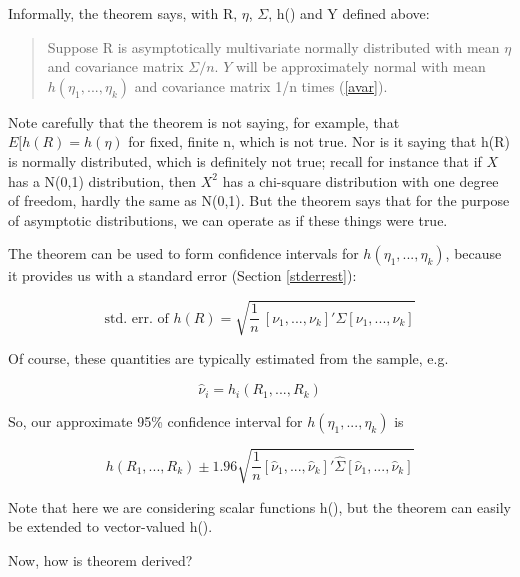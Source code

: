 Informally, the theorem says, with R, $\eta$, $\Sigma$, h() and Y
defined above:

\begin{quote}
Suppose R is asymptotically multivariate normally distributed
with mean $\eta$ and covariance matrix $\Sigma/n$.  $Y$ will be 
approximately normal with mean $h(\eta_1,...,\eta_k)$ and covariance 
matrix 1/n times (\ref{avar}).  
\end{quote} 

Note carefully that the theorem is not saying, for example, that $E[h(R)
= h(\eta)$ for fixed, finite n, which is not true.  Nor is it saying
that h(R) is normally distributed, which is definitely not true; recall
for instance that if $X$ has a N(0,1) distribution, then $X^2$ has a
chi-square distribution with one degree of freedom, hardly the same as
N(0,1).  But the theorem says that for the purpose of asymptotic
distributions, we can operate as if these things were true.

The theorem can be used to form confidence intervals for
$h(\eta_1,...,\eta_k)$, because it provides us with a standard error
(Section \ref{stderrest}): 

\begin{equation}
\textrm{std. err. of } h(R) = \sqrt{\frac{1}{n} ~ 
[\nu_1,...,\nu_k]' \Sigma [\nu_1,...,\nu_k]}
\end{equation}

Of course, these quantities are typically estimated from the sample,
e.g.

\begin{equation}
\widehat{\nu}_i = h_i(R_1,...,R_k)
\end{equation}

So, our approximate 95\% confidence interval for $h(\eta_1,...,\eta_k)$
is 

\begin{equation}
\label{deltaci}
h(R_1,...,R_k) \pm 1.96 
\sqrt{
\frac{1}{n}
[\widehat{\nu}_1,...,\widehat{\nu}_k]' \widehat{\Sigma} [\widehat{\nu}_1,...,\widehat{\nu}_k]
}
\end{equation}


Note that here we are considering scalar functions h(), but the theorem
can easily be extended to vector-valued h().

Now, how is theorem derived?

